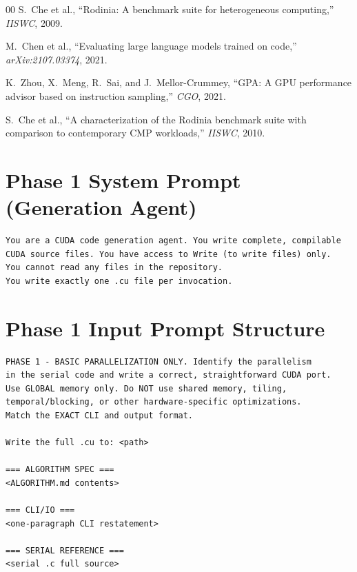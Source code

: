 \documentclass[conference]{IEEEtran}
\newcommand{\mainbodyendpage}{?}
\begin{document}
\begin{thebibliography}{00}
S.~Che et al., ``Rodinia: A benchmark suite for heterogeneous computing,''
\emph{IISWC}, 2009.

M.~Chen et al., ``Evaluating large language models trained on code,''
\emph{arXiv:2107.03374}, 2021.

K.~Zhou, X.~Meng, R.~Sai, and J.~Mellor-Crummey, ``GPA: A GPU performance
advisor based on instruction sampling,'' \emph{CGO}, 2021.

S.~Che et al., ``A characterization of the Rodinia benchmark suite with
comparison to contemporary CMP workloads,'' \emph{IISWC}, 2010.
\end{thebibliography}

\xdef\mainbodyendpage{\thepage}

\clearpage
\appendices

\section{Phase 1 System Prompt (Generation Agent)}
\begin{lstlisting}
You are a CUDA code generation agent. You write complete, compilable
CUDA source files. You have access to Write (to write files) only.
You cannot read any files in the repository.
You write exactly one .cu file per invocation.
\end{lstlisting}

\section{Phase 1 Input Prompt Structure}
\begin{lstlisting}
PHASE 1 - BASIC PARALLELIZATION ONLY. Identify the parallelism
in the serial code and write a correct, straightforward CUDA port.
Use GLOBAL memory only. Do NOT use shared memory, tiling,
temporal/blocking, or other hardware-specific optimizations.
Match the EXACT CLI and output format.

Write the full .cu to: <path>

=== ALGORITHM SPEC ===
<ALGORITHM.md contents>

=== CLI/IO ===
<one-paragraph CLI restatement>

=== SERIAL REFERENCE ===
<serial .c full source>
\end{lstlisting}
\end{document}
